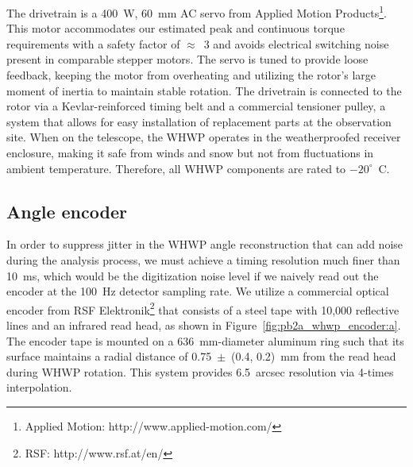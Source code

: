 The drivetrain is a 400~W, 60~mm AC servo from Applied Motion Products\footnote{Applied Motion: http://www.applied-motion.com/}. This motor accommodates our estimated peak and continuous torque requirements with a safety factor of $\approx$~3 and avoids electrical switching noise present in comparable stepper motors. The servo is tuned to provide loose feedback, keeping the motor from overheating and utilizing the rotor’s large moment of inertia to maintain stable rotation. The drivetrain is connected to the rotor via a Kevlar-reinforced timing belt and a commercial tensioner pulley, a system that allows for easy installation of replacement parts at the observation site. When on the telescope, the WHWP operates in the weatherproofed receiver enclosure, making it safe from winds and snow but not from fluctuations in ambient temperature. Therefore, all WHWP components are rated to $-20^{\circ}$~C.


\subsection{Angle encoder}
\label{sec:pb2a_whwp_angle_encoder}

In order to suppress jitter in the WHWP angle reconstruction that can add noise during the analysis process, we must achieve a timing resolution much finer than 10~ms, which would be the digitization noise level if we naively read out the encoder at the 100~Hz detector sampling rate. We utilize a commercial optical encoder from RSF Elektronik\footnote{RSF: http://www.rsf.at/en/} that consists of a steel tape with 10,000 reflective lines and an infrared read head, as shown in Figure~\ref{fig:pb2a_whwp_encoder:a}. The encoder tape is mounted on a 636~mm-diameter aluminum ring such that its surface maintains a radial distance of 0.75~$\pm$~(0.4, 0.2)~mm from the read head during WHWP rotation. This system provides 6.5~arcsec resolution via 4-times interpolation.

